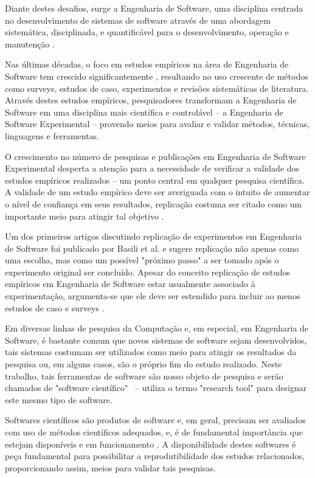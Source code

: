 \documentclass[qual, classic, a4paper]{ufbathesis}
\begin{document}
Diante destes desafios, surge a Engenharia de Software, uma disciplina
centrada no desenvolvimento de sistemas de software \cite{Wohlin2012} através
de uma abordagem sistemática, disciplinada, e quantificável para o
desenvolvimento, operação e manutenção \cite{SWEBOK2014}.

Nas últimas décadas, o foco em estudos empíricos na área de Engenharia de
Software tem crescido significantemente \cite{Stol2015}, resultando no uso
crescente de métodos como surveys, estudos de caso, experimentos e revisões
sistemáticas de literatura. Através destes estudos empíricos, pesquisadores
transformam a Engenharia de Software em uma disciplina mais científica e
controlável -- a  Engenharia de Software Experimental -- provendo meios para
avaliar e validar métodos, técnicas, linguagens e ferramentas.

O crescimento no número de pesquisas e publicações em Engenharia de Software
Experimental desperta a atenção para a necessidade de verificar a validade dos
estudos empíricos realizados -- um ponto central em qualquer pesquisa
científica. A validade de um estudo empírico deve ser averiguada com o intuito
de aumentar o nível de confiança em seus resultados, replicação costuma ser
citado como um importante meio para atingir tal objetivo \cite{Almqvist2006}.

Um dos primeiros artigos discutindo replicação de experimentos em Engenharia
de Software foi publicado por Basili et al. \cite{Mantyla2010} e sugere
replicação não apenas como uma escolha, mas como um possível "próximo passo" a
ser tomado após o experimento original ser concluído. Apesar do conceito
replicação de estudos empíricos em Engenharia de Software estar usualmente
associado à experimentação, argumenta-se que ele deve ser estendido para
incluir ao menos estudos de caso e surveys \cite{Basili1986}.

Em diversas linhas de pesquisa da Computação e, em especial, em Engenharia de
Software, é bastante comum que novos sistemas de software sejam desenvolvidos,
tais sistemas costumam ser utilizados como meio para atingir os resultados da
pesquisa ou, em alguns casos, são o próprio fim do estudo realizado. Neste
trabalho, tais ferramentas de software são nosso objeto de pesquisa e serão
chamados de "software científico" \ --  utiliza o
termo "research tool" para designar este mesmo tipo de software.

Softwares científicos são produtos de software e, em geral, precisam ser
avaliados com uso de métodos científicos adequados, e, é de fundamental
importância que estejam disponíveis e em funcionamento \cite{Kon2011}. A
disponibilidade destes softwares é peça fundamental para possibilitar a
reprodutibilidade dos estudos relacionados, proporcionando assim, meios para
validar tais pesquisas.
\end{document}
